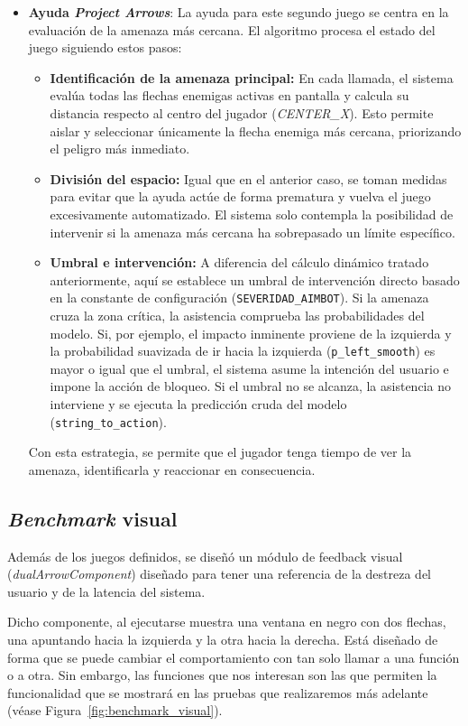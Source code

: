 \begin{itemize}
    \item \textbf{Ayuda \textit{Project Arrows}}: La ayuda para este segundo juego se centra en la evaluación de la amenaza más cercana. El algoritmo procesa el estado del juego siguiendo estos pasos:
    \begin{itemize}
        \item \textbf{Identificación de la amenaza principal:} En cada llamada, el sistema evalúa todas las flechas enemigas activas en pantalla y calcula su distancia respecto al centro del jugador (\textit{CENTER\_X}). Esto permite aislar y seleccionar únicamente la flecha enemiga más cercana, priorizando el peligro más inmediato.
        \item \textbf{División del espacio:} Igual que en el anterior caso, se toman medidas para evitar que la ayuda actúe de forma prematura y vuelva el juego excesivamente automatizado. El sistema solo contempla la posibilidad de intervenir si la amenaza más cercana ha sobrepasado un límite específico.
        \item \textbf{Umbral e intervención:} A diferencia del cálculo dinámico tratado anteriormente, aquí se establece un umbral de intervención directo basado en la constante de configuración (\texttt{SEVERIDAD\_AIMBOT}). Si la amenaza cruza la zona crítica, la asistencia comprueba las probabilidades del modelo. Si, por ejemplo, el impacto inminente proviene de la izquierda y la probabilidad suavizada de ir hacia la izquierda (\texttt{p\_left\_smooth}) es mayor o igual que el umbral, el sistema asume la intención del usuario e impone la acción de bloqueo. Si el umbral no se alcanza, la asistencia no interviene y se ejecuta la predicción cruda del modelo (\texttt{string\_to\_action}).
    \end{itemize}
    Con esta estrategia, se permite que el jugador tenga tiempo de ver la amenaza, identificarla y reaccionar en consecuencia.
\end{itemize}

\subsection{\textit{Benchmark} visual}
\label{subsec:benchmark_visual}

Además de los juegos definidos, se diseñó un módulo de feedback visual (\textit{dualArrowComponent}) diseñado para tener una referencia de la destreza del usuario y de la latencia del sistema. 

Dicho componente, al ejecutarse muestra una ventana en negro con dos flechas, una apuntando hacia la izquierda y la otra hacia la derecha. Está diseñado de forma que se puede cambiar el comportamiento con tan solo llamar a una función o a otra. Sin embargo, las funciones que nos interesan son las que permiten la funcionalidad que se mostrará en las pruebas que realizaremos más adelante (véase Figura~\ref{fig:benchmark_visual}). 

